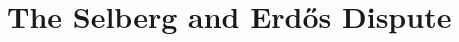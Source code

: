 \documentclass[elemannt.tex]{subfile}
\begin{document}
	\chapter{The Selberg and Erd\H{o}s Dispute}\label{ch:dispute}
\end{document}
